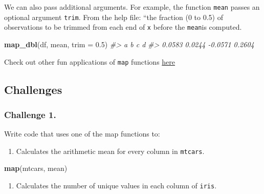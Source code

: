 \documentclass[]{book}
\newenvironment{Shaded}{\begin{snugshade}}{\end{snugshade}}
\newcommand{\KeywordTok}[1]{\textcolor[rgb]{0.13,0.29,0.53}{\textbf{#1}}}
\newcommand{\DataTypeTok}[1]{\textcolor[rgb]{0.13,0.29,0.53}{#1}}
\newcommand{\FloatTok}[1]{\textcolor[rgb]{0.00,0.00,0.81}{#1}}
\newcommand{\StringTok}[1]{\textcolor[rgb]{0.31,0.60,0.02}{#1}}
\newcommand{\CommentTok}[1]{\textcolor[rgb]{0.56,0.35,0.01}{\textit{#1}}}
\newcommand{\OperatorTok}[1]{\textcolor[rgb]{0.81,0.36,0.00}{\textbf{#1}}}
\newcommand{\NormalTok}[1]{#1}
\providecommand{\tightlist}{%
  \setlength{\itemsep}{0pt}\setlength{\parskip}{0pt}}
\begin{document}
We can also pass additional arguments. For example, the function
\texttt{mean} passes an optional argument \texttt{trim}. From the help
file: ``the fraction (0 to 0.5) of observations to be trimmed from each
end of \texttt{x} before the \texttt{mean}is computed.

\begin{Shaded}
\begin{Highlighting}[]
\KeywordTok{map_dbl}\NormalTok{(df, mean, }\DataTypeTok{trim =} \FloatTok{0.5}\NormalTok{)}
\CommentTok{#>       a       b       c       d }
\CommentTok{#>  0.0583  0.0244 -0.0571  0.2604}
\end{Highlighting}
\end{Shaded}

Check out other fun applications of \texttt{map} functions
\href{https://r4ds.had.co.nz/iteration.html\#the-map-functions}{here}

\subsection{Challenges}\label{challenges-17}

\subsubsection*{Challenge 1.}\label{challenge-1.-5}

Write code that uses one of the map functions to:

\begin{enumerate}
\def\labelenumi{\arabic{enumi}.}
\tightlist
\item
  Calculates the arithmetic mean for every column in \texttt{mtcars}.
\end{enumerate}

\begin{Shaded}
\begin{Highlighting}[]
\KeywordTok{map}\NormalTok{(mtcars, mean)}
\end{Highlighting}
\end{Shaded}

\begin{enumerate}
\def\labelenumi{\arabic{enumi}.}
\setcounter{enumi}{1}
\tightlist
\item
  Calculates the number of unique values in each column of
  \texttt{iris}.
\end{enumerate}

\begin{Shaded}
\end{Shaded}
\end{document}
